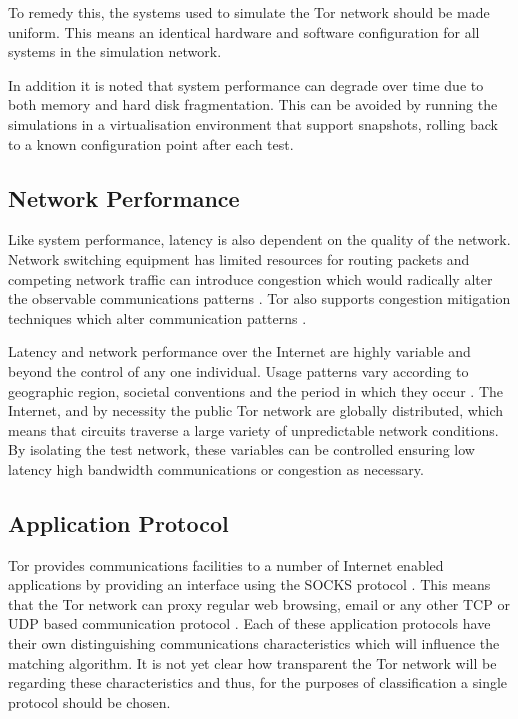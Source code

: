 \documentclass{ecuthesis}
\begin{document}
To remedy this, the systems used to simulate the Tor network should be made
uniform. This means an identical hardware and software configuration for all
systems in the simulation network.

In addition it is noted that system performance can degrade over time due to
both memory and hard disk fragmentation. This can be avoided by running the
simulations in a virtualisation environment that support snapshots, rolling
back to a known configuration point after each test.

\subsection{Network Performance}

Like system performance, latency is also dependent on the quality of the
network. Network switching equipment has limited resources for routing packets
and competing network traffic can introduce congestion which would radically
alter the observable communications patterns \parencite{Jacobson:1995p6768}.
Tor also supports congestion mitigation techniques which alter communication
patterns \parencite[p. 8]{Dingledine:2004p314}.

Latency and network performance over the Internet are highly variable and
beyond the control of any one individual. Usage patterns vary according to
geographic region, societal conventions and the period in which they occur
\parencite{Thompson97wide-areainternet,Ken03longitudinalstudy}. The Internet,
and by necessity the public Tor network are globally distributed, which means
that circuits traverse a large variety of unpredictable network conditions. By
isolating the test network, these variables can be controlled ensuring low
latency high bandwidth communications or congestion as necessary.

\subsection{Application Protocol}

Tor provides communications facilities to a number of Internet enabled
applications by providing an interface using the SOCKS protocol \parencite[p.
17]{Dingledine:2004p314}. This means that the Tor network can proxy regular web
browsing, email or any other TCP or UDP based communication protocol
\parencite{website:socks}. Each of these application protocols have their own
distinguishing communications characteristics which will influence the matching
algorithm. It is not yet clear how transparent the Tor network will be
regarding these characteristics and thus, for the purposes of classification a
single protocol should be chosen.
\end{document}
